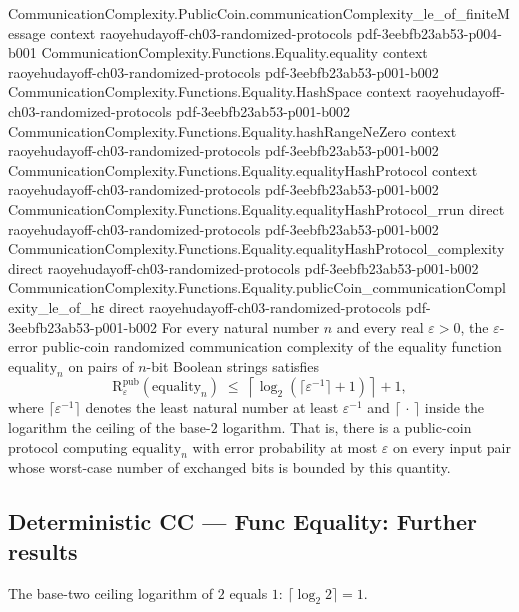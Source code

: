 \begin{theorem}
\proofstep
  {CommunicationComplexity.PublicCoin.communicationComplexity_le_of_finiteMessage}
  {context}
  {raoyehudayoff-ch03-randomized-protocols}
  {pdf-3eebfb23ab53-p004-b001}
\proofstep
  {CommunicationComplexity.Functions.Equality.equality}
  {context}
  {raoyehudayoff-ch03-randomized-protocols}
  {pdf-3eebfb23ab53-p001-b002}
\proofstep
  {CommunicationComplexity.Functions.Equality.HashSpace}
  {context}
  {raoyehudayoff-ch03-randomized-protocols}
  {pdf-3eebfb23ab53-p001-b002}
\proofstep
  {CommunicationComplexity.Functions.Equality.hashRangeNeZero}
  {context}
  {raoyehudayoff-ch03-randomized-protocols}
  {pdf-3eebfb23ab53-p001-b002}
\proofstep
  {CommunicationComplexity.Functions.Equality.equalityHashProtocol}
  {context}
  {raoyehudayoff-ch03-randomized-protocols}
  {pdf-3eebfb23ab53-p001-b002}
\proofstep
  {CommunicationComplexity.Functions.Equality.equalityHashProtocol_rrun}
  {direct}
  {raoyehudayoff-ch03-randomized-protocols}
  {pdf-3eebfb23ab53-p001-b002}
\proofstep
  {CommunicationComplexity.Functions.Equality.equalityHashProtocol_complexity}
  {direct}
  {raoyehudayoff-ch03-randomized-protocols}
  {pdf-3eebfb23ab53-p001-b002}
\proofstep
  {CommunicationComplexity.Functions.Equality.publicCoin_communicationComplexity_le_of_hε}
  {direct}
  {raoyehudayoff-ch03-randomized-protocols}
  {pdf-3eebfb23ab53-p001-b002}
For every natural number $n$ and every real $\varepsilon > 0$, the $\varepsilon$-error
public-coin randomized communication complexity of the equality function
$\mathrm{equality}_n$ on pairs of $n$-bit Boolean strings satisfies
\[
  \mathrm{R}^{\mathrm{pub}}_\varepsilon(\mathrm{equality}_n)
  \;\le\;
  \left\lceil \log_2\!\left(\lceil \varepsilon^{-1}\rceil + 1\right)\right\rceil + 1,
\]
where $\lceil \varepsilon^{-1}\rceil$ denotes the least natural number at least
$\varepsilon^{-1}$ and $\lceil\,\cdot\,\rceil$ inside the logarithm the ceiling of the
base-$2$ logarithm. That is, there is a public-coin protocol computing
$\mathrm{equality}_n$ with error probability at most $\varepsilon$ on every input pair
whose worst-case number of exchanged bits is bounded by this quantity.
\end{theorem}

\subsection*{Deterministic CC --- Func Equality: Further results}

\begin{theorem}
\label{CommunicationComplexity.Functions.Equality.clog_two_two}
\leanok
{}
The base-two ceiling logarithm of $2$ equals $1$: $\lceil\log_2 2\rceil=1$.
\end{theorem}
